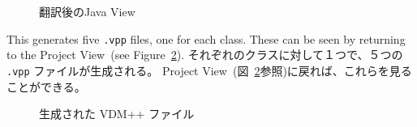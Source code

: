 \documentclass[\pformat,12pt]{jarticle}
\newcommand{\guicmd}[1]{{\sf #1}}
\begin{document}
\begin{figure}[tbh]
\begin{center}
\caption{翻訳後のJava View}\label{fig:translationDone}
\end{center}
\end{figure}

This generates five {\tt .vpp} files, one for each class. These can be
seen by returning to the \guicmd{Project View}~(see
Figure~\ref{fig:vdmFiles}). 
それぞれのクラスに対して１つで、５つの {\tt .vpp} ファイルが生成される。
 \guicmd{Project View}~(図~\ref{fig:vdmFiles}参照)に戻れば、これらを見ることができる。

\begin{figure}[tbh]
\begin{center}
\caption{生成された VDM++ ファイル}\label{fig:vdmFiles}
\end{center}
\end{figure}
\end{document}
